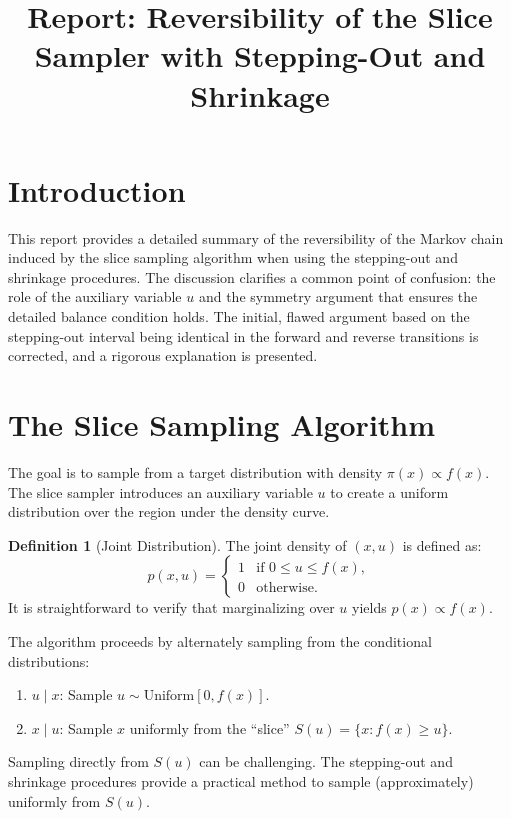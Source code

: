 \documentclass[12pt]{article}
\title{Report: Reversibility of the Slice Sampler with Stepping-Out and Shrinkage}
\author{}
\date{}
\theoremstyle{definition}
\newtheorem{definition}{Definition}
\begin{document}
\maketitle

\section{Introduction}
This report provides a detailed summary of the reversibility of the Markov chain induced by the slice sampling algorithm when using the stepping-out and shrinkage procedures. The discussion clarifies a common point of confusion: the role of the auxiliary variable \( u \) and the symmetry argument that ensures the detailed balance condition holds. The initial, flawed argument based on the stepping-out interval being identical in the forward and reverse transitions is corrected, and a rigorous explanation is presented.

\section{The Slice Sampling Algorithm}
The goal is to sample from a target distribution with density \( \pi(x) \propto f(x) \). The slice sampler introduces an auxiliary variable \( u \) to create a uniform distribution over the region under the density curve.

\begin{definition}[Joint Distribution]
The joint density of \( (x, u) \) is defined as:
\[
p(x, u) = 
\begin{cases} 
1 & \text{if } 0 \le u \le f(x), \\
0 & \text{otherwise}.
\end{cases}
\]
It is straightforward to verify that marginalizing over \( u \) yields \( p(x) \propto f(x) \).
\end{definition}

The algorithm proceeds by alternately sampling from the conditional distributions:
\begin{enumerate}
    \item \( u \mid x \): Sample \( u \sim \text{Uniform}[0, f(x)] \).
    \item \( x \mid u \): Sample \( x \) uniformly from the ``slice'' \( S(u) = \{ x : f(x) \ge u \} \).
\end{enumerate}

Sampling directly from \( S(u) \) can be challenging. The stepping-out and shrinkage procedures provide a practical method to sample (approximately) uniformly from \( S(u) \).
\end{document}
